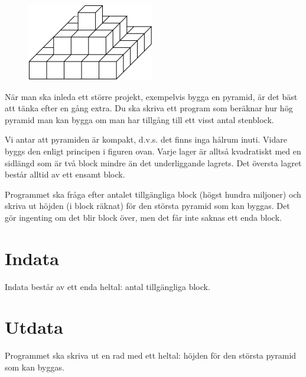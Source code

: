 
\begin{figure}[h!]
  \centering
  \includegraphics[scale=1.5]{pyramid}
\end{figure}

När man ska inleda ett större projekt, exempelvis bygga en pyramid, är det bäst att tänka efter en gång extra.
Du ska skriva ett program som beräknar hur hög pyramid man kan bygga om man har tillgång till ett visst antal stenblock.

Vi antar att pyramiden är kompakt, d.v.s. det finns inga hålrum inuti.
Vidare byggs den enligt principen i figuren ovan.
Varje lager är alltså kvadratiskt med en sidlängd som är två block mindre än det underliggande lagrets.
Det översta lagret består alltid av ett ensamt block.

Programmet ska fråga efter antalet tillgängliga block (högst hundra miljoner) och skriva ut höjden (i block räknat) för den största pyramid som kan byggas.
Det gör ingenting om det blir block över, men det får inte saknas ett enda block.

\section*{Indata}
Indata består av ett enda heltal: antal tillgängliga block.

\section*{Utdata}
Programmet ska skriva ut en rad med ett heltal: höjden för den största pyramid som kan byggas.
